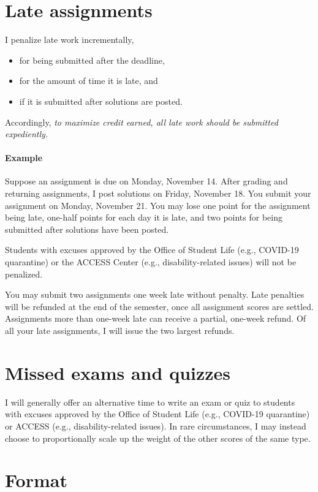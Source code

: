 \documentclass[
    letterpaper,paper=portrait,fleqn,
    DIV=16,fontsize=11pt,twoside=semi,
    parskip=full-,
    headings=standardclasses]
{scrartcl}
\begin{document}
\section*{Late assignments}

I penalize late work incrementally,

\begin{itemize}[nosep]
\item for being submitted after the deadline,
\item for the amount of time it is late, and
\item if it is submitted after solutions are posted.
\end{itemize}
Accordingly, \emph{to maximize credit earned, all late work should be submitted expediently.}

\paragraph{Example} Suppose an assignment is due on Monday, November 14. After grading and returning assignments, I post solutions on Friday, November 18. You submit your assignment on Monday, November 21. You may lose one point for the assignment being late, one-half points for each day it is late, and two points for being submitted after solutions have been posted.

Students with excuses approved by the Office of Student Life (e.g., COVID-19 quarantine) or the ACCESS Center (e.g., disability-related issues) will not be penalized.

You may submit two assignments one week late without penalty. Late penalties will be refunded at the end of the semester, once all assignment scores are settled. Assignments more than one-week late can receive a partial, one-week refund. Of all your late assignments, I will issue the two largest refunds.

\section*{Missed exams and quizzes}

I will generally offer an alternative time to write an exam or quiz to students with excuses approved by the Office of Student Life (e.g., COVID-19 quarantine) or ACCESS (e.g., disability-related issues). In rare circumstances, I may instead choose to proportionally scale up the weight of the other scores of the same type.

\section*{Format}
\end{document}
